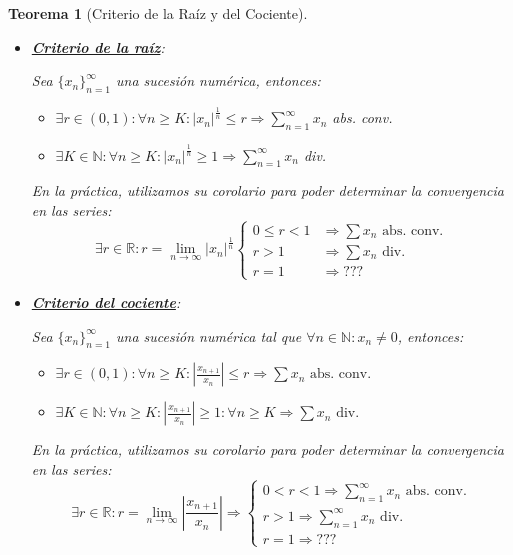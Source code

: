 \documentclass[10pt,a4paper,openright]{book}
\theoremstyle{break}
\newtheorem{theo}{Teorema}[chapter]
\begin{document}
\begin{theo}[Criterio de la Raíz y del Cociente]
\begin{itemize}
\item \underline{\textbf{Criterio de la raíz}}:

	Sea $\{x_n\}_{n=1}^\infty$ una sucesión numérica, entonces:
	\begin{itemize}
	\item $\exists r\in (0,1): \forall n\geq K: |x_n|^\frac{1}{n}\leq r \Rightarrow  \sum_{n=1}^{\infty} x_n$ abs. conv.
	\item $\exists K \in \mathbb N: \forall n\geq K: |x_n|^\frac{1}{n} \geq 1 \Rightarrow \sum_{n=1}^{\infty} x_n$ div.
	\end{itemize}
	En la práctica, utilizamos su corolario para poder determinar la convergencia en las series:
$$\exists r \in \mathbb R: r= \lim_{n \rightarrow \infty} |x_n|^{\frac{1}{n}} \begin{cases}
0 \leq r < 1 &\Rightarrow \sum x_n \mbox{ abs. conv.} \\ r>1 &\Rightarrow \sum x_n\mbox{ div.}\\ r=1 &\Rightarrow ???\end{cases}$$

	
\item \underline{\textbf{Criterio del cociente}}:
	
	Sea $\{x_n\}_{n=1}^\infty$ una sucesión numérica tal que $\forall n \in \mathbb{N} : x_n \neq 0$, entonces:
	\begin{itemize}
	\item $\exists r\in (0,1): \forall n\geq K: \left|\frac{x_{n+1}}{x_n}\right| \leq r \Rightarrow \sum x_n \mbox{ abs. conv. }$
	\item $\exists K \in \mathbb N: \forall n\geq K: \left|\frac{x_{n+1}}{x_n}\right| \geq 1 : \forall n \geq K \Rightarrow \sum x_n \mbox{ div. } $
	\end{itemize}
	En la práctica, utilizamos su corolario para poder determinar la convergencia en las series:
	$$\exists r\in \mathbb R: r = \lim_{n \rightarrow \infty} \left|\frac{x_{n+1}}{x_n}\right|\Rightarrow \begin{cases} 0<r<1 \Rightarrow \sum_{n=1}^{\infty} x_n \mbox{ abs. conv.} \\ r>1 \Rightarrow  \sum_{n=1}^{\infty} x_n \mbox{ div. } \\ r = 1 \Rightarrow ??? \end{cases}	$$
\end{itemize}
\end{theo}
\end{document}

